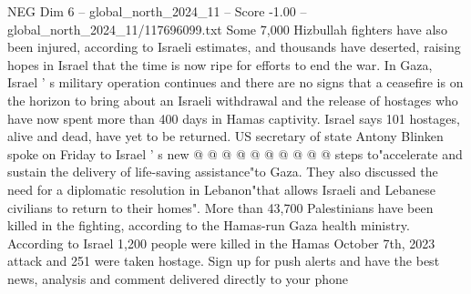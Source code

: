 \begin{textsample}{NEG Dim 6 – global\_north\_2024\_11 – Score -1.00 – global\_north\_2024\_11/117696099.txt}
Some 7,000 Hizbullah fighters have also been injured, according to Israeli estimates, and thousands have deserted, raising hopes in Israel that the time is now ripe for efforts to end the war.
In Gaza, Israel ' s military operation continues and there are no signs that a ceasefire is on the horizon to bring about an Israeli withdrawal and the release of hostages who have now spent more than 400 days in Hamas captivity.
Israel says 101 hostages, alive and dead, have yet to be returned.
US secretary of state Antony Blinken spoke on Friday to Israel ' s new @ @ @ @ @ @ @ @ @ @ steps to"accelerate and sustain the delivery of life-saving assistance"to Gaza.
They also discussed the need for a diplomatic resolution in Lebanon"that allows Israeli and Lebanese civilians to return to their homes".
More than 43,700 Palestinians have been killed in the fighting, according to the Hamas-run Gaza health ministry.
According to Israel 1,200 people were killed in the Hamas October 7th, 2023 attack and 251 were taken hostage.
Sign up for push alerts and have the best news, analysis and comment delivered directly to your phone

\end{textsample}
